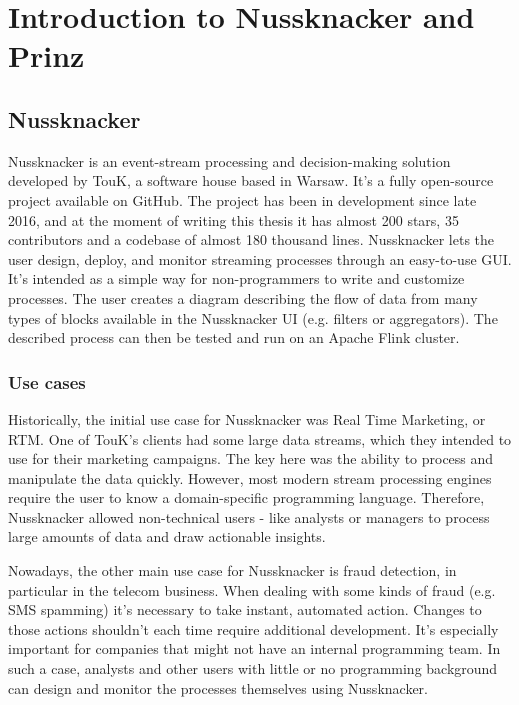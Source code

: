 \chapter{Introduction to Nussknacker and Prinz}
\label{chap:intro-nussknacker-prinz}

\section{Nussknacker}

Nussknacker is an event-stream processing and decision-making solution developed by TouK, a software house based in Warsaw.
It's a fully open-source project available on GitHub.
The project has been in development since late 2016, and at the moment of writing this thesis it has almost 200 stars, 35 contributors and a codebase of almost 180 thousand lines.
Nussknacker lets the user design, deploy, and monitor streaming processes through an easy-to-use GUI.
It's intended as a simple way for non-programmers to write and customize processes.
The user creates a diagram describing the flow of data from many types of blocks available in the Nussknacker UI (e.g. filters or aggregators).
The described process can then be tested and run on an Apache Flink cluster.

\subsection{Use cases}

Historically, the initial use case for Nussknacker was Real Time Marketing, or RTM.
One of TouK's clients had some large data streams, which they intended to use for their marketing campaigns.
The key here was the ability to process and manipulate the data quickly.
However, most modern stream processing engines require the user to know a domain-specific programming language.
Therefore, Nussknacker allowed non-technical users - like analysts or managers to process large amounts of data and draw actionable insights.

Nowadays, the other main use case for Nussknacker is fraud detection, in particular in the telecom business.
When dealing with some kinds of fraud (e.g. SMS spamming) it's necessary to take instant, automated action.
Changes to those actions shouldn't each time require additional development.
It's especially important for companies that might not have an internal programming team.
In such a case, analysts and other users with little or no programming background can design and monitor the processes themselves using Nussknacker.

